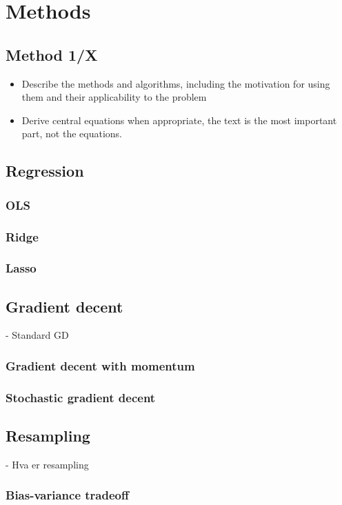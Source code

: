 \documentclass[amssymb,twocolumn,aps]{revtex4}
\begin{document}
\section{Methods}\label{section:methods}

\subsection{Method 1/X}

\begin{itemize}
    \item Describe the methods and algorithms, including the motivation for using them and their applicability to the problem
    \item Derive central equations when appropriate, the text is the most important part, not the equations.
\end{itemize}

\subsection{Regression}
\subsubsection{OLS}
\subsubsection{Ridge}
\subsubsection{Lasso}
    
\subsection{Gradient decent}
- Standard GD
\subsubsection{Gradient decent with momentum}
\subsubsection{Stochastic gradient decent} 
\subsection{Resampling}
- Hva er resampling
\subsubsection{Bias-variance tradeoff}
\end{document}
